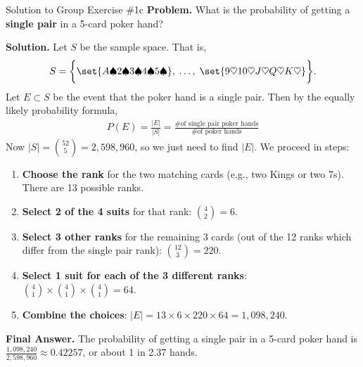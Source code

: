 \documentclass[10pt]{beamer}
\begin{document}
\begin{frame}{Solution to Group Exercise \#1c}
\footnotesize 
 \colorbox{blue!30}{\textbf{Problem.}} What is the probability of getting a \textbf{single pair} in a 5-card poker hand?
\vfill 

 \colorbox{green!30}{\textbf{Solution.}} Let $S$ be the sample space.  That is, 
\[S=\bigg\{ \set{A\spadesuit 2 \spadesuit 3 \spadesuit 4 \spadesuit 5 \spadesuit}, \;   \hdots, \; \set{9 \heartsuit 10 \heartsuit J \heartsuit Q \heartsuit K \heartsuit} \bigg\}. \]
Let $E \subset S$ be the event that the poker hand is a single pair. Then by the equally likely probability formula, 
\begin{align*}
P(E) = 	\frac{|E|}{|S|} = \frac{\text{\# of single pair poker hands}}{\text{\# of poker hands}}
\end{align*}
Now $|S|=\binom{52}{5} =  2,598,960$, so we just need to find $|E|$.  We proceed in steps:

\begin{enumerate} \footnotesize 
\item \textbf{Choose the rank} for the two matching cards 	(e.g., two Kings or two 7s).  There are 13 possible ranks.
\item \textbf{Select 2 of the 4 suits} for that rank:  $\binom{4}{2}=6$.
\item  \textbf{Select 3 other ranks} for the remaining 3 cards (out of the 12 ranks which differ from the single pair rank): $\binom{12}{3}=220$. 
\item \textbf{Select 1 suit for each of the 3 different ranks}: $\binom{4}{1} \times \binom{4}{1} \times \binom{4}{1} = 64.$
\item \textbf{Combine the choices}:  $|E|=13 \times 6 \times 220 \times 64 = 1,098,240$.
\end{enumerate}
\vspace{-.1cm}
\alert{\textbf{Final Answer.}} The probability of getting a single pair in a 5-card poker hand is $\frac{1,098,240}{2,598,960} \approx 0.42257$, or about 1 in 2.37 hands.
\end{frame}
\end{document}
